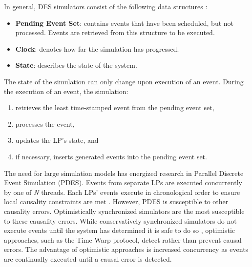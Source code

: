 \documentclass[11pt]{book}
\begin{document}
In general, DES simulators consist of the following data structures \cite{fujimoto}:

\vspace*{-\bigskipamount}
\begin{singlespace}
\begin{itemize}
  \item\textbf{Pending Event Set}: contains events that have been scheduled, but not
    processed.  Events are retrieved from this structure to be executed.
  \item\textbf{Clock}: denotes how far the simulation has progressed.
  \item\textbf{State}: describes the state of the system.
\end{itemize}
\end{singlespace}

\noindent
The state of the simulation can only change upon execution of an event.  During the
execution of an event, the simulation: 

\vspace*{-\bigskipamount}
\begin{singlespace}
\begin{enumerate}
  \item retrieves the least time-stamped event from the pending event set,
  \item processes the event, 
  \item updates the LP's state, and 
  \item if necessary, inserts generated events into the pending event set.
\end{enumerate}
\end{singlespace}

The need for large simulation models has energized research in Parallel Discrete Event
Simulation (PDES).  Events from separate LPs are executed concurrently by one of \emph{N}
threads.  Each LPs' events execute in chronological order to ensure local causality
constraints are met \cite{fujimoto}.  However, PDES is susceptible to other causality
errors.  Optimistically synchronized simulators are the most susceptible to these
causality errors.  While conservatively synchronized simulators do not execute events
until the system has determined it is safe to do so \cite{fujimoto}, optimistic
approaches, such as the Time Warp protocol, detect rather than prevent causal errors. The
advantage of optimistic approaches is increased concurrency as events are continually
executed until a causal error is detected.
\end{document}
